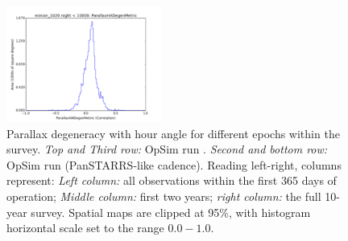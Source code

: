 \begin{figure}[ht]
\begin{center}
  \includegraphics[width=2.0in]{./figs/milkyway/astromPanels/MW_Astrom_paDegen_PanSTARRS_10y_hst.png}
  \end{center}
  \caption{Parallax degeneracy with hour angle for different epochs within the survey. {\it Top and Third row:} OpSim run . {\it Second and bottom row:} OpSim run  (PanSTARRS-like cadence). Reading left-right, columns represent: {\it Left column:} all observations within the first 365 days of operation; {\it Middle column:} first two years; {\it right column:} the full 10-year survey. Spatial maps are clipped at 95\%, with histogram horizontal scale set to the range $0.0-1.0$.}
  \label{fig_astrom_ByTime_PADegen}
\end{figure}



